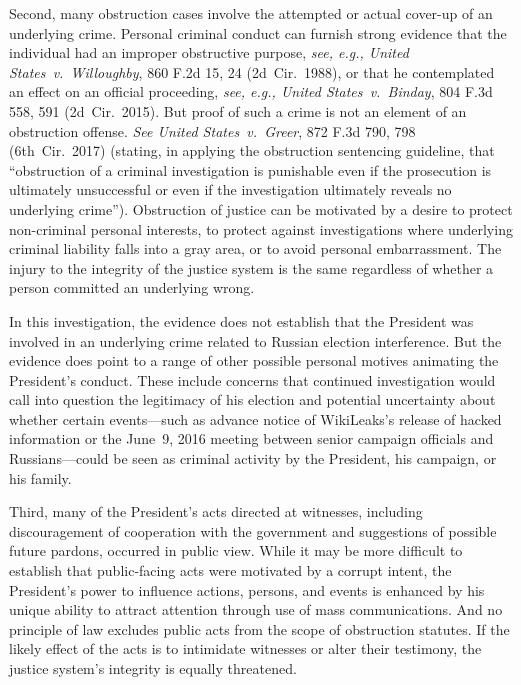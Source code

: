 Second, many obstruction cases involve the attempted or actual cover-up of an underlying crime.
Personal criminal conduct can furnish strong evidence that the individual had an improper obstructive purpose, \textit{see, e.g., United States~v.\ Willoughby}, 860 F.2d 15, 24 (2d~Cir.~1988), or that he contemplated an effect on an official proceeding, \textit{see, e.g., United States~v.\ Binday}, 804 F.3d 558, 591 (2d~Cir.~2015).
But proof of such a crime is not an element of an obstruction offense.
\textit{See United States~v.\ Greer}, 872 F.3d 790, 798 (6th~Cir.~2017) (stating, in applying the obstruction sentencing guideline, that ``obstruction of a criminal investigation is punishable even if the prosecution is ultimately unsuccessful or even if the investigation ultimately reveals no underlying crime'').
Obstruction of justice can be motivated by a desire to protect non-criminal personal interests, to protect against investigations where underlying criminal liability falls into a gray area, or to avoid personal embarrassment.
The injury to the integrity of the justice system is the same regardless of whether a person committed an underlying wrong.

In this investigation, the evidence does not establish that the President was involved in an underlying crime related to Russian election interference.
But the evidence does point to a range of other possible personal motives animating the President's conduct.
These include concerns that continued investigation would call into question the legitimacy of his election and potential uncertainty about whether certain events---such as advance notice of WikiLeaks's release of hacked information or the June~9, 2016 meeting between senior campaign officials and Russians---could be seen as criminal activity by the President, his campaign, or his family.

Third, many of the President's acts directed at witnesses, including discouragement of cooperation with the government and suggestions of possible future pardons, occurred in public view.
While it may be more difficult to establish that public-facing acts were motivated by a corrupt intent, the President's power to influence actions, persons, and events is enhanced by his unique ability to attract attention through use of mass communications.
And no principle of law excludes public acts from the scope of obstruction statutes.
If the likely effect of the acts is to intimidate witnesses or alter their testimony, the justice system's integrity is equally threatened.

